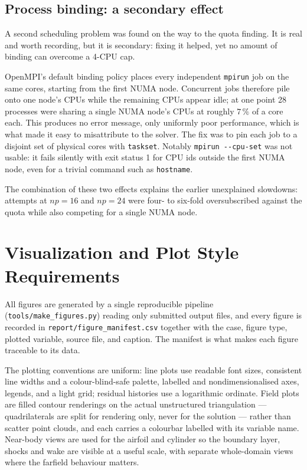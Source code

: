 \subsection{Process binding: a secondary effect}
\label{sec:binding}

A second scheduling problem was found on the way to the quota finding. It is real
and worth recording, but it is secondary: fixing it helped, yet no amount of
binding can overcome a 4-CPU cap.

OpenMPI's default binding policy places every independent \texttt{mpirun} job on
the same cores, starting from the first NUMA node. Concurrent jobs therefore pile
onto one node's CPUs while the remaining CPUs appear idle; at one point 28
processes were sharing a single NUMA node's CPUs at roughly $7\,\%$ of a core
each. This produces no error message, only uniformly poor performance, which is
what made it easy to misattribute to the solver. The fix was to pin each job to a
disjoint set of physical cores with \texttt{taskset}. Notably
\texttt{mpirun -{}-cpu-set} was not usable: it fails silently with exit status 1
for CPU ids outside the first NUMA node, even for a trivial command such as
\texttt{hostname}.

The combination of these two effects explains the earlier unexplained slowdowns:
attempts at $np=16$ and $np=24$ were four- to six-fold oversubscribed against the
quota while also competing for a single NUMA node.

\section{Visualization and Plot Style Requirements}
\label{sec:visualization}

All figures are generated by a single reproducible pipeline
(\texttt{tools/make\_figures.py}) reading only submitted output files, and every
figure is recorded in \texttt{report/figure\_manifest.csv} together with the case,
figure type, plotted variable, source file, and caption. The manifest is what makes
each figure traceable to its data.

The plotting conventions are uniform: line plots use readable font sizes,
consistent line widths and a colour-blind-safe palette, labelled and
nondimensionalised axes, legends, and a light grid; residual histories use a
logarithmic ordinate. Field plots are filled contour renderings on the actual
unstructured triangulation --- quadrilaterals are split for rendering only, never
for the solution --- rather than scatter point clouds, and each carries a colourbar
labelled with its variable name. Near-body views are used for the airfoil and
cylinder so the boundary layer, shocks and wake are visible at a useful scale, with
separate whole-domain views where the farfield behaviour matters.

